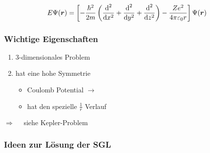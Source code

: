 \begin{equation*}
E \Psi(\bm{r}) = \left[- \frac{\hbar^2}{2m} \left(\frac{\textrm{d} ^2}{\textrm{d} x^2} + \frac{\textrm{d} ^2}{\textrm{d} y^2} + \frac{\textrm{d} ^2}{\textrm{d} z^2}\right) - \frac{Z e^2}{4 \pi \varepsilon_0 r}\right] \Psi (\bm{r})
\end{equation*}

\subsubsection{Wichtige Eigenschaften}

\begin{enumerate}[(1)]
	\item 3-dimensionales Problem
	\item hat eine hohe Symmetrie
	\begin{itemize}
		\item Coulomb Potential $ \rightarrow $ 
		\item hat den spezielle $ \frac{1}{r} $ Verlauf
	\end{itemize}
\end{enumerate}
$ \Rightarrow \quad $ siehe Kepler-Problem

\subsubsection{Ideen zur Lösung der SGL}

